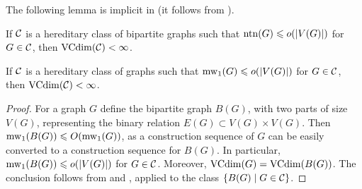 The following lemma is implicit in \cite{flip-width}
(it follows from 
\cite[Lem. 5.25]{flip-width-arxiv}).
\begin{lemma}\label{lem:ntn}
    If $\mathcal C$ is a hereditary class of bipartite graphs such that $\mathrm{ntn}(G)\leqslant o(|V(G)|)$ for $G \in \mathcal C$, then $\operatorname{VCdim}(\mathcal C)<\infty$.
\end{lemma}





\begin{corollary}\label{lem:abmw-vc}
    If $\mathcal C$ is a hereditary class of graphs such that $\operatorname{mw}_1(G)\leqslant o(|V(G)|)$ for $G \in \mathcal C$, then $\operatorname{VCdim}(\mathcal C)<\infty$.
\end{corollary}
    \begin{proof}
For a graph $G$ define the bipartite graph $B(G)$, with two parts of size $V(G)$,
representing the binary relation $E(G)\subset V(G)\times V(G)$.
Then $\operatorname{mw}_1(B(G))\leqslant O (\operatorname{mw}_1(G))$, as a construction sequence of $G$ can
be easily converted to a construction sequence for $B(G)$.
In particular, $\operatorname{mw}_1(B(G))\leqslant o(|V(G)|)$ for $G\in \mathcal C$.
Moreover, $\operatorname{VCdim}(G)=\operatorname{VCdim}(B(G))$.
The conclusion follows from 
and , applied to the class $\{B(G)\mid G\in\mathcal C\}$.
    \end{proof}




